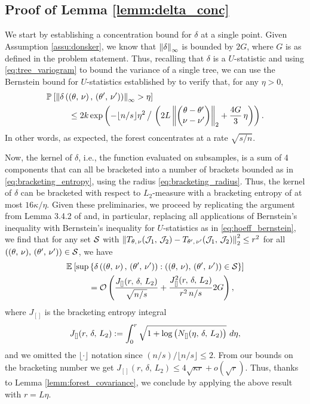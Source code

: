 \documentclass[aos]{imsart}
\theoremstyle{plain}
\theoremstyle{definition}
\theoremstyle{remark}
\begin{document}
\begin{CJK}{UTF8}{gbsn}
{\begin{appendix}
\subsection*{Proof of Lemma \ref{lemm:delta_conc}}

We start by establishing a concentration bound for
$\delta$ at a single point. Given Assumption \ref{assu:donsker}, we
know that $\left\lVert\delta\right\rVert_\infty$ is bounded by $2G$, where $G$ is as defined in the problem statement. Thus,
recalling that $\delta$ is a $U$-statistic and using \eqref{eq:tree_variogram}
to bound the variance of a single tree, we can use the Bernstein bound for $U$-statistics
established by \citet{hoeffding1963probability} to verify that, for any $\eta > 0$,
\begin{equation}
\label{eq:hoeff_bernstein}
\begin{split}
&\PP{\Norm{\delta\p{\p{\theta, \, \nu}, \, \p{\theta', \, \nu'}}}_\infty > \eta} \\
& \ \ \ \ \ \ \ \ 
\leq 2k \exp\p{-\lfloor n/s \rfloor \eta^2 \, \big/ \, \p{2 L \Norm{\begin{pmatrix} \theta -\theta' \\ \nu - \nu' \end{pmatrix}}_2 + \frac{4G}{3}\, \eta}}.
\end{split}
\end{equation}
In other words, as expected, the forest concentrates at a rate $\sqrt{s/n}$.

Now, the kernel of $\delta$, i.e., the function evaluated on
subsamples, is a sum of 4 components that can all be bracketed into a number of brackets bounded
as in \eqref{eq:bracketing_entropy}, using the radius \eqref{eq:bracketing_radius}. Thus, the kernel of $\delta$ can
be bracketed with respect to $L_2$-measure with a bracketing entropy of at most $16\kappa/\eta$.
Given these preliminaries, we proceed by replicating the argument
from Lemma 3.4.2 of \citet{van1996weak} and, in particular, replacing all applications of Bernstein's
inequality with Bernstein's inequality for $U$-statistics as in \eqref{eq:hoeff_bernstein},
we find that for any set $\mathcal{S}$ with
$\left\lVert T_{\theta, \, \nu}(\mathcal{J}_1, \, \mathcal{J}_2) - T_{\theta', \, \nu'}(\mathcal{J}_1, \, \mathcal{J}_2)\right\rVert_2^2 \leq r^2$
for all $((\theta, \, \nu), \, (\theta', \, \nu')) \in \mathcal{S}$, we have
\begin{align*}
&\EE{\sup\cb{\delta\p{\p{\theta, \, \nu}, \, \p{\theta', \, \nu'}} : ((\theta, \, \nu), \, (\theta', \, \nu')) \in \set}} \\
&\ \ \ \ \ \ \ \ = \oo\p{\frac{J_{[]}(r, \, \delta, \, L_2)}{\sqrt{ n/s }} + \frac{J^2_{[]}(r, \, \delta, \, L_2)}{r^2 \,  n/s } 2G},
\end{align*}
where $J_{[]}$ is the bracketing entropy integral
$$ J_{[]}(r, \, \delta, \, L_2) := \int_0^r \sqrt{1 + \log \left(N_{[]}(\eta, \, \delta, \, L_2)\right)} \ d\eta, $$
and we omitted the $\lfloor \cdot \rfloor$ notation since $(n/s) / \lfloor n/s \rfloor \leq 2$.
From our bounds on the bracketing number we get $J_{[]}(r, \, \delta, \, L_2) \leq 4\sqrt{\kappa r} + o(\sqrt{r})$.
Thus, thanks to Lemma \ref{lemm:forest_covariance}, we conclude by applying the above result with
$r = L \eta$.


\end{appendix}}
\end{CJK}
\end{document}
